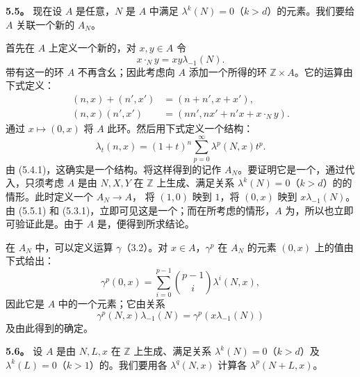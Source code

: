 \textbf{5.5。} 现在设 $A$ 是任意，$N$ 是 $A$ 中满足 $\lambda^k(N)=0$（$k>d$）的元素。我们要给 $A$ 关联一个新的 $A_N$。

首先在 $A$ 上定义一个新的，对 $x,y\in A$ 令
\[
x\mathbin{\cdot_N}y=xy\lambda_{-1}(N).
\tag{5.5.1}
\]
带有这一的环 $A$ 不再含幺；因此考虑向 $A$ 添加一个所得的环 $\mathbb Z\times A$。它的运算由下式定义：
\[
\begin{aligned}
(n,x)+(n',x')&=(n+n',x+x'),\\
(n,x)(n',x')&=(nn',nx'+n'x+x\mathbin{\cdot_N}y).
\end{aligned}
\tag{5.5.2}
\]
通过 $x\longmapsto(0,x)$ 将 $A$ 此环。然后用下式定义一个结构：
\[
\lambda_t(n,x)=(1+t)^n\sum_{p=0}^{\infty}\lambda^p(N,x)t^p.
\tag{5.5.3}
\]
由 (5.4.1)，这确实是一个结构。将这样得到的记作 $A_N$。要证明它是一个，通过代入，只须考虑 $A$ 是由 $N,X,Y$ 在 $\mathbb Z$ 上生成、满足关系 $\lambda^k(N)=0$（$k>d$）的的情形。此时定义一个 $A_N\longrightarrow A$，
将 $(1,0)$ 映到 $1$，将 $(0,x)$ 映到 $x\lambda_{-1}(N)$。由 (5.5.1) 和 (5.3.1)，立即可见这是一个；而在所考虑的情形，$A$ 为，所以也立即可验证此是。由于 $A$ 是，便得到所求结论。

在 $A_N$ 中，可以定义运算 $\gamma$（3.2）。对 $x\in A$，$\gamma^p$ 在 $A_N$ 的元素 $(0,x)$ 上的值由下式给出：
\[
\gamma^p(0,x)=\sum_{i=0}^{p-1}\binom{p-1}{i}\lambda^i(N,x),
\]
因此它是 $A$ 中的一个元素；它由关系
\[
\gamma^p(N,x)\lambda_{-1}(N)=\gamma^p(x\lambda_{-1}(N))
\tag{5.5.4}
\]
及由此得到的确定。

\textbf{5.6。} 设 $A$ 是由 $N,L,x$ 在 $\mathbb Z$ 上生成、满足关系 $\lambda^k(N)=0$（$k>d$）及 $\lambda^k(L)=0$（$k>1$）的。我们要用各 $\lambda^q(N,x)$ 计算各 $\lambda^p(N+L,x)$。

